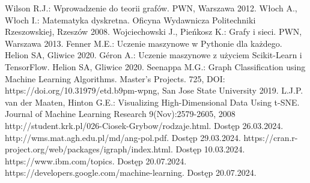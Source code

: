 
\begin{thebibliography}{4}
 Wilson R.J.: Wprowadzenie do teorii grafów. PWN, Warszawa 2012.
 Włoch A., Włoch I.: Matematyka dyskretna. Oficyna Wydawnicza Politechniki Rzeszowskiej, Rzeszów 2008.
 Wojciechowski J., Pieńkosz K.: Grafy i sieci. PWN, Warszawa 2013.
 Fenner M.E.: Uczenie maszynowe w Pythonie dla każdego. Helion SA, Gliwice 2020.
 Géron A.: Uczenie maszynowe z użyciem Scikit-Learn i TensorFlow. Helion SA, Gliwice 2020.
 Seenappa M.G.: Graph Classification using Machine Learning Algorithms. Master's Projects. 725, DOI: https://doi.org/10.31979/etd.b9pm-wpng, San Jose State University 2019.
 L.J.P. van der Maaten, Hinton G.E.: Visualizing High-Dimensional Data Using t-SNE. Journal of Machine Learning Research 9(Nov):2579-2605, 2008
 http://student.krk.pl/026-Ciosek-Grybow/rodzaje.html. Dostęp 26.03.2024.
 http://wms.mat.agh.edu.pl/\texttildelow md/ang-pol.pdf. Dostęp 29.03.2024. 
 https://cran.r-project.org/web/packages/igraph/index.html. Dostęp 10.03.2024.
 https://www.ibm.com/topics. Dostęp 20.07.2024.
 https://developers.google.com/machine-learning. Dostęp 20.07.2024.
\end{thebibliography}